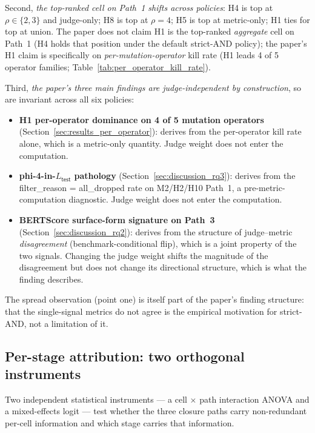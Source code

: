 Second, \emph{the top-ranked cell on Path~1 shifts across policies}: H4 is top at $\rho \in \{2, 3\}$ and judge-only; H8 is top at $\rho = 4$; H5 is top at metric-only; H1 ties for top at union. The paper does not claim H1 is the top-ranked \emph{aggregate} cell on Path~1 (H4 holds that position under the default strict-AND policy); the paper's H1 claim is specifically on \emph{per-mutation-operator} kill rate (H1 leads 4 of 5 operator families; Table~\ref{tab:per_operator_kill_rate}).

Third, \emph{the paper's three main findings are judge-independent by construction}, so are invariant across all six policies:

\begin{itemize}
  \item \textbf{H1 per-operator dominance on 4 of 5 mutation operators} (Section~\ref{sec:results_per_operator}): derives from the per-operator kill rate alone, which is a metric-only quantity. Judge weight does not enter the computation.
  \item \textbf{phi-4-in-$L_{\textsf{test}}$ pathology} (Section~\ref{sec:discussion_rq3}): derives from the \textsf{filter\_reason} = \textsf{all\_dropped} rate on M2/H2/H10 Path~1, a pre-metric-computation diagnostic. Judge weight does not enter the computation.
  \item \textbf{BERTScore surface-form signature on Path~3} (Section~\ref{sec:discussion_rq2}): derives from the structure of judge--metric \emph{disagreement} (benchmark-conditional flip), which is a joint property of the two signals. Changing the judge weight shifts the magnitude of the disagreement but does not change its directional structure, which is what the finding describes.
\end{itemize}

The spread observation (point one) is itself part of the paper's finding structure: that the single-signal metrics do not agree is the empirical motivation for strict-AND, not a limitation of it.

\subsection{Per-stage attribution: two orthogonal instruments}
\label{sec:results_path_cell_interaction}
\label{sec:results_mixed_logit}

Two independent statistical instruments --- a cell $\times$ path interaction ANOVA and a mixed-effects logit --- test whether the three closure paths carry non-redundant per-cell information and which stage carries that information.

